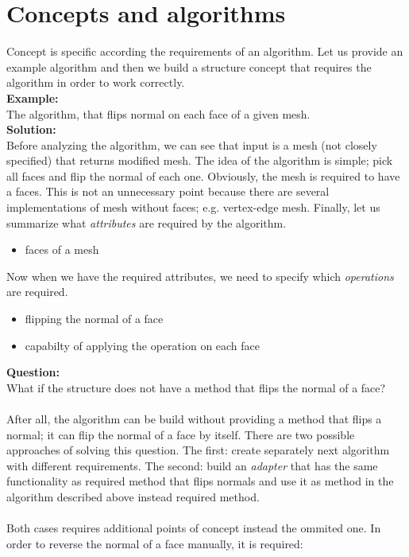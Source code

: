 \section{Concepts and algorithms}

Concept is specific according the requirements of an algorithm. Let us provide an example
algorithm and then we build a structure concept that requires the algorithm in order to work 
correctly.\\

\textbf{Example:}\\
The algorithm, that flips normal on each face of a given mesh.\\

\textbf{Solution:}\\
Before analyzing the algorithm, we can see that input is a mesh (not closely specified)
that returns modified mesh. The idea of the algorithm is simple; pick all faces
and flip the normal of each one. Obviously, the mesh is required to have a faces. This is not an
unnecessary point because there are several implementations of mesh without faces; e.g.
vertex-edge mesh. Finally, let us summarize what \emph{attributes} are required by the algorithm.

\begin{itemize}
\item faces of a mesh
\end{itemize}

Now when we have the required attributes, we need to specify which \emph{operations} are required.

\begin{itemize}
\item flipping the normal of a face 
\item capabilty of applying the operation on each face
\end{itemize}

\textbf{Question:}\\
What if the structure does not have a method that flips the normal of a face?\\
\\
After all, the algorithm can be build without providing a method that flips a normal;
it can flip the normal of a face by itself.
There are two possible approaches of solving this question. The first: create separately
next algorithm with different requirements. The second: build an \emph{adapter} that
has the same functionality as required method that flips normals and use it as method
in the algorithm described above instead required method.\\
\\
Both cases requires additional points of concept instead the ommited one.
In order to reverse the normal of a face manually, it is required:

